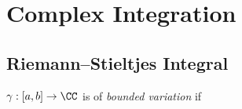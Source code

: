 \chapter{Complex Integration}\label{chap:complex-integration}
\section{Riemann--Stieltjes Integral}
\begin{definition}
$\gamma:[a,b]\to\CC$ is of \emph{bounded variation} if 
\end{definition}
